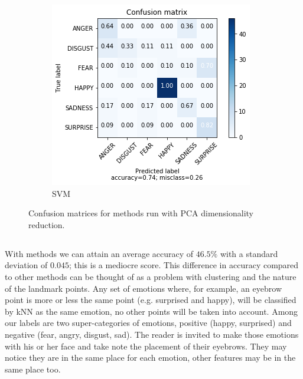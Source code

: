 \begin{figure}
    \begin{subfigure}[b]{0.24\textwidth}
        \includegraphics[width=\textwidth]{figures/pca-svm.png}
        \caption{SVM}
        \label{fig:pca-svm}
    \end{subfigure}
    \caption{Confusion matrices for methods run with PCA dimensionality reduction.}\label{fig:results}
\end{figure}

\subsection{\knn}

With \knn methods we can attain an average accuracy of $46.5\%$ with a standard deviation of $0.045$; this is a mediocre score. This difference in accuracy compared to other methods can be thought of as a problem with clustering and the nature of the landmark points. Any set of emotions where, for example, an eyebrow point is more or less the same point (e.g. surprised and happy), will be classified by kNN as the same emotion, no other points will be taken into account. Among our labels are two super-categories of emotions, positive (happy, surprised) and negative (fear, angry, disgust, sad). The reader is invited to make those emotions with his or her face and take note the placement of their eyebrows. They may notice they are in the same place for each emotion, other features may be in the same place too.

